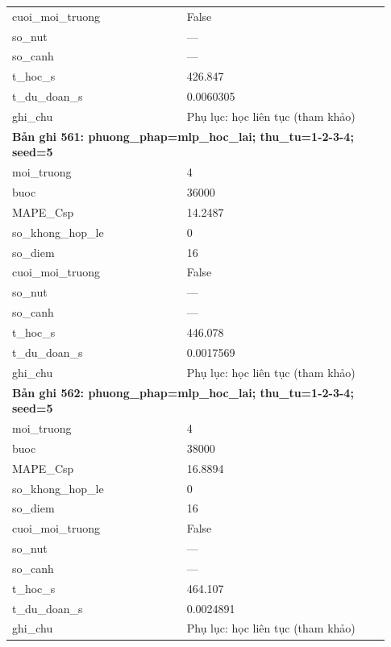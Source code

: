 \begin{longtable}{p{0.43\linewidth}p{0.50\linewidth}}
cuoi\_\allowbreak moi\_\allowbreak truong & False \\
so\_\allowbreak nut & — \\
so\_\allowbreak canh & — \\
t\_\allowbreak hoc\_\allowbreak s & 426.847 \\
t\_\allowbreak du\_\allowbreak doan\_\allowbreak s & 0.0060305 \\
ghi\_\allowbreak chu & Phụ lục: học liên tục (tham khảo) \\
\midrule
\multicolumn{2}{p{0.95\linewidth}}{\textbf{Bản ghi 561: phuong\_phap=mlp\_hoc\_lai; thu\_tu=1-2-3-4; seed=5}} \\
moi\_\allowbreak truong & 4 \\
buoc & 36000 \\
MAPE\_\allowbreak Csp & 14.2487 \\
so\_\allowbreak khong\_\allowbreak hop\_\allowbreak le & 0 \\
so\_\allowbreak diem & 16 \\
cuoi\_\allowbreak moi\_\allowbreak truong & False \\
so\_\allowbreak nut & — \\
so\_\allowbreak canh & — \\
t\_\allowbreak hoc\_\allowbreak s & 446.078 \\
t\_\allowbreak du\_\allowbreak doan\_\allowbreak s & 0.0017569 \\
ghi\_\allowbreak chu & Phụ lục: học liên tục (tham khảo) \\
\midrule
\multicolumn{2}{p{0.95\linewidth}}{\textbf{Bản ghi 562: phuong\_phap=mlp\_hoc\_lai; thu\_tu=1-2-3-4; seed=5}} \\
moi\_\allowbreak truong & 4 \\
buoc & 38000 \\
MAPE\_\allowbreak Csp & 16.8894 \\
so\_\allowbreak khong\_\allowbreak hop\_\allowbreak le & 0 \\
so\_\allowbreak diem & 16 \\
cuoi\_\allowbreak moi\_\allowbreak truong & False \\
so\_\allowbreak nut & — \\
so\_\allowbreak canh & — \\
t\_\allowbreak hoc\_\allowbreak s & 464.107 \\
t\_\allowbreak du\_\allowbreak doan\_\allowbreak s & 0.0024891 \\
ghi\_\allowbreak chu & Phụ lục: học liên tục (tham khảo) \\

\end{longtable}
